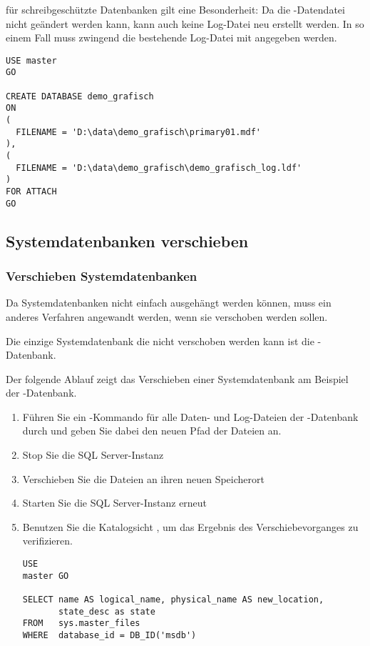           f\"ur schreibgeschützte Datenbanken gilt eine Besonderheit: Da die
          -Datendatei nicht geändert werden kann, kann auch
          keine Log-Datei neu erstellt werden. In so einem Fall muss zwingend
          die bestehende Log-Datei mit angegeben werden.
          \begin{lstlisting}[language=ms_sql,caption={Anfügen der
          schreibgeschützten Datenbank demo\_grafisch},label=admin03_22]
USE master 
GO

CREATE DATABASE demo_grafisch
ON 
(
  FILENAME = 'D:\data\demo_grafisch\primary01.mdf'
),
(
  FILENAME = 'D:\data\demo_grafisch\demo_grafisch_log.ldf'
)
FOR ATTACH
GO
          \end{lstlisting}    
          \begin{literaturinternet}
            \item \cite{ms190794}
          \end{literaturinternet}
      \subsection{Systemdatenbanken verschieben}
        \subsubsection{Verschieben Systemdatenbanken}
          Da Systemdatenbanken nicht einfach ausgehängt werden können, muss ein
          anderes Verfahren angewandt werden, wenn sie verschoben werden
          sollen.
          \begin{merke}
            Die einzige Systemdatenbank die nicht verschoben werden kann ist die
            -Datenbank.
          \end{merke}
          Der folgende Ablauf zeigt das Verschieben einer Systemdatenbank am
          Beispiel der -Datenbank.
          \begin{enumerate}
              \item Führen Sie ein -Kommando f\"ur alle Daten- und Log-Dateien der
              -Datenbank durch und geben Sie dabei den neuen
              Pfad der Dateien an.
              \item Stop Sie die SQL Server-Instanz
              \item Verschieben Sie die Dateien an ihren neuen Speicherort
              \item Starten Sie die SQL Server-Instanz erneut
              \item Benutzen Sie die Katalogsicht
              , um das Ergebnis des
              Verschiebevorganges zu verifizieren.
                \begin{lstlisting}[language=ms_sql,caption={Abfragen
                der View \identifier{sys.master\_files}},label=admin03_23]
USE
master GO

SELECT name AS logical_name, physical_name AS new_location, 
       state_desc as state
FROM   sys.master_files
WHERE  database_id = DB_ID('msdb')
                \end{lstlisting}
          \end{enumerate}
